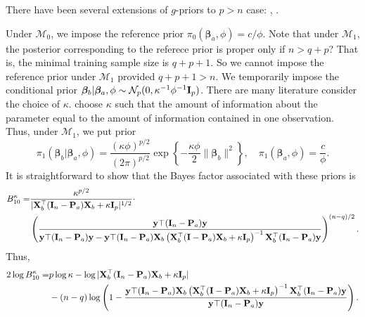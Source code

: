 \documentclass[11pt]{article}
\newcommand{\By}{\mathbf{y}}    \newcommand{\Bz}{\mathbf{z}}
\newcommand{\bfsym}[1]{\ensuremath{\boldsymbol{#1}}}
\def\bbeta{\bfsym \beta}
\theoremstyle{plain}
\theoremstyle{definition}
\theoremstyle{remark}
\begin{document}
There have been several extensions of $g$-priors to $p>n$ case: \cite{maruyama2011}, \cite{Shang2011}.

Under $\mathcal M_0$, we impose the reference prior $\pi_0 (\bbeta_a,\phi)=c/\phi$.
Note that under $\mathcal M_1$, the posterior corresponding to the referece prior is proper only if $n>q + p$?
That is, the minimal training sample size is $q + p +1$.
So we cannot impose the reference prior under $\mathcal M_1$ provided $q + p +1 >n$.
We temporarily impose the conditional prior $\bbeta_b|\bbeta_a, \phi \sim \mathcal N_{p} (0, \kappa^{-1} \phi^{-1} \BI_{p}) $.
There are many literature consider the choice of $\kappa$.
\cite{Kass1995} choose $\kappa$ such that the amount of information about the parameter equal to the amount of information contained in one observation.
Thus, under $\mathcal M_1$, we put prior
\begin{equation*}
    \pi_1 (\bbeta_b | \bbeta_a, \phi) =\frac{(\kappa \phi )^{p/2}}{(2\pi )^{p/2}}  
    \exp\left\{
        -\frac{\kappa \phi }{2} \|\bbeta_b\|^2
    \right\}
    ,\quad
    \pi_1(\bbeta_a, \phi) = \frac{c}{\phi}.
\end{equation*}
It is straightforward to show that the Bayes factor associated with these priors is
\begin{equation*}
    \begin{split}
        B_{10}^{\kappa}=  &
    \frac{\kappa^{p/2}}{
        |\BX_b^\top (\BI_n -\BP_a) \BX_b + \kappa \BI_p |^{1/2}
    }
    \cdot
    \\
    &
    \left(
        \frac{
            \By\top (\BI_n-\BP_a) \By
        }{
            \By\top (\BI_n-\BP_a) \By
            -
            \By\top (\BI_n-\BP_a) \BX_b
            \left(\BX_b^\top  (\BI-\BP_a) \BX_b + \kappa \BI_p\right)^{-1}
            \BX_b^\top (\BI_n-\BP_a) \By
        }
    \right)^{(n-q)/2}.
    \end{split}
\end{equation*}
Thus,
\begin{equation*}
    \begin{split}
        2\log B_{10}^{\kappa} =  &
    p\log \kappa
    -
        \log |\BX_b^\top (\BI_n -\BP_a) \BX_b + \kappa \BI_p |
    \\
    &
    -(n-q)\log \left(
            1-
        \frac{
            \By\top (\BI_n-\BP_a) \BX_b
            \left(\BX_b^\top  (\BI-\BP_a) \BX_b + \kappa \BI_p\right)^{-1}
            \BX_b^\top (\BI_n-\BP_a) \By
        }{
            \By\top (\BI_n-\BP_a) \By
        }
    \right).
    \end{split}
\end{equation*}
\end{document}
